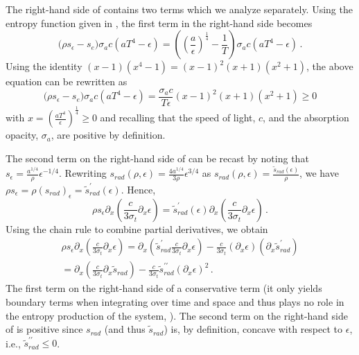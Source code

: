 \documentclass[times,doublespace]{fldauth}%
\begin{document}
The right-hand side of  contains two terms which we analyze separately. 
Using the entropy function given in , the first term in the right-hand side becomes
%
\begin{equation} 
\Big( \rho s_\epsilon -s_e \Big)  \sigma_a c \left( a T^4 - \epsilon \right) 
= \left( \left( \frac{a}{\epsilon}\right)^\frac{1}{4} - \frac{1}{T} \right)   \sigma_a c \left( a T^4 - \epsilon \right) \,.
\end{equation}
Using the identity $(x-1)(x^4-1) = (x-1)^2(x+1)(x^2+1)$, the above equation can be rewritten as
\begin{equation} 
\Big( \rho s_\epsilon -s_e \Big)  \sigma_a c \left( a T^4 - \epsilon \right) 
= \frac{\sigma_a c}{T \epsilon}  (x-1)^2(x+1)(x^2+1) \geq 0
\end{equation}
%
with $x=  \left(\frac{aT^4}{\epsilon}\right)^\frac{1}{4} \geq 0$ and recalling that the speed of light, $c$,
and the absorption opacity, $\sigma_a$, are positive by definition. 

The second term on the right-hand side of  can be recast by noting that $s_\epsilon = 
\frac{a^{1/4}}{\rho} \epsilon^{-1/4}$. Rewriting $s_{rad}(\rho, \epsilon) = \frac{4a^{1/4}}{3\rho} \epsilon^{3/4}$ 
as  $s_{rad}(\rho, \epsilon) = \frac{\tilde{s}_{rad}(\epsilon)}{\rho}$, we have
$ \rho s_\epsilon = \rho (s_{rad})_\epsilon = \tilde{s}^\prime_{rad}(\epsilon)$. Hence, 
\begin{equation}
\rho s_\epsilon \partial_x \left( \frac{c}{3 \sigma_t} \partial_x \epsilon \right) 
=
 \tilde{s}^\prime_{rad}(\epsilon) \partial_x \left( \frac{c}{3 \sigma_t} \partial_x \epsilon \right)  \,.
\end{equation}
%
Using the chain rule to combine partial derivatives, we obtain
%
\begin{multline} \label{eq:final_form_second_term}
\rho s_\epsilon \partial_x \left( \frac{c}{3 \sigma_t} \partial_x \epsilon \right) 
=
 \partial_x \left(  \tilde{s}^\prime_{rad}  \frac{c}{3 \sigma_t} \partial_x \epsilon \right) 
-
\frac{c}{3 \sigma_t} \left(  \partial_x \epsilon \right)  \left( \partial_x \tilde{s}^\prime_{rad}  \right) \\
=
 \partial_x \left(   \frac{c}{3 \sigma_t} \partial_x \tilde{s}_{rad}  \right) 
-
\frac{c}{3 \sigma_t} \tilde{s}^{\prime\prime}_{rad}  \left(  \partial_x \epsilon \right)^2  \,.
\end{multline}
%
The first term on the right-hand side of  a conservative term (it only yields boundary 
terms when integrating over time and space and thus plays no role in the entropy production of the system, 
\cite{Leveque}). The second term on the right-hand side of  is positive 
since $s_{rad}$ (and thus $\tilde{s}_{rad}$) is, by definition, concave with respect to $\epsilon$, i.e., $\tilde{s}^{\prime\prime}_{rad} \leq 0$.
\end{document}
